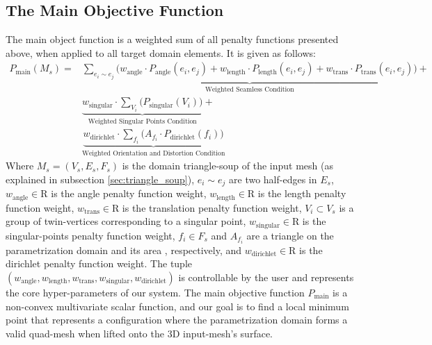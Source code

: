 \subsection{The Main Objective Function}
The main object function is a weighted sum of all penalty functions presented above, when applied to all target domain elements. It is given as follows:
\begin{equation}\label{eq:main_objective_function}
\begin{split}
P_{\mathrm{main}}\left(M_s\right) = &\underbrace{\sum_{e_i \sim e_j} \Big(w_{\mathrm{angle}} \cdot P_{\mathrm{angle}}\left(e_i,e_j\right) + w_{\mathrm{length}} \cdot P_{\mathrm{length}}\left(e_i,e_j\right) + w_{\mathrm{trans}} \cdot P_{\mathrm{trans}}\left(e_i,e_j\right)\Big)}_{\text{Weighted Seamless Condition}} + \\
&\underbrace{w_{\mathrm{singular}} \cdot \sum_{V_i} \Big(P_{\mathrm{singular}}\left(V_i\right)\Big)}_{\text{Weighted Singular Points Condition}} +
\\
&\underbrace{w_{\mathrm{dirichlet}} \cdot \sum_{f_i} \Big(A_{f_i} \cdot P_{\mathrm{dirichlet}}\left(f_i\right)\Big)}_{\text{Weighted Orientation and Distortion Condition}}
\end{split}
\end{equation}
Where $M_s = \left(V_s, E_s, F_s\right)$ is the domain triangle-soup of the input mesh (as explained in subsection \ref{sec:triangle_soup}), $e_i \sim e_j$ are two half-edges in $E_s$, $w_{\mathrm{angle}} \in \mathrm{R}$ is the angle penalty function weight, $w_{\mathrm{length}} \in \mathrm{R}$ is the length penalty function weight, $w_{\mathrm{trans}} \in \mathrm{R}$ is the translation penalty function weight, $V_i \subset V_s$ is a group of twin-vertices corresponding to a singular point, $w_{\mathrm{singular}} \in \mathrm{R}$ is the singular-points penalty function weight, $f_i \in F_s$ and $A_{f_i}$ are a triangle on the parametrization domain and its area , respectively, and $w_{\mathrm{dirichlet}} \in \mathrm{R}$ is the dirichlet penalty function weight. The tuple $\left(w_{\mathrm{angle}}, w_{\mathrm{length}}, w_{\mathrm{trans}}, w_{\mathrm{singular}}, w_{\mathrm{dirichlet}}\right)$ is controllable by the user and represents the core hyper-parameters of our system. The main objective function $P_{\mathrm{main}}$ is a non-convex multivariate scalar function, and our goal is to find a local minimum point that represents a configuration where the parametrization domain forms a valid quad-mesh when lifted onto the 3D input-mesh's surface.
